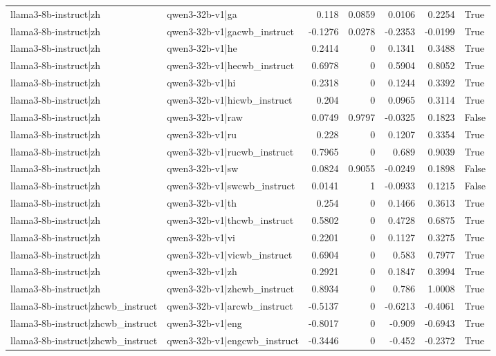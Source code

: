 \begin{table}
\begin{tabular}{l l r r r r l}
llama3-8b-instruct|zh & qwen3-32b-v1|ga & 0.118 & 0.0859 & 0.0106 & 0.2254 & True \\
llama3-8b-instruct|zh & qwen3-32b-v1|gacwb_instruct & -0.1276 & 0.0278 & -0.2353 & -0.0199 & True \\
llama3-8b-instruct|zh & qwen3-32b-v1|he & 0.2414 & 0 & 0.1341 & 0.3488 & True \\
llama3-8b-instruct|zh & qwen3-32b-v1|hecwb_instruct & 0.6978 & 0 & 0.5904 & 0.8052 & True \\
llama3-8b-instruct|zh & qwen3-32b-v1|hi & 0.2318 & 0 & 0.1244 & 0.3392 & True \\
llama3-8b-instruct|zh & qwen3-32b-v1|hicwb_instruct & 0.204 & 0 & 0.0965 & 0.3114 & True \\
llama3-8b-instruct|zh & qwen3-32b-v1|raw & 0.0749 & 0.9797 & -0.0325 & 0.1823 & False \\
llama3-8b-instruct|zh & qwen3-32b-v1|ru & 0.228 & 0 & 0.1207 & 0.3354 & True \\
llama3-8b-instruct|zh & qwen3-32b-v1|rucwb_instruct & 0.7965 & 0 & 0.689 & 0.9039 & True \\
llama3-8b-instruct|zh & qwen3-32b-v1|sw & 0.0824 & 0.9055 & -0.0249 & 0.1898 & False \\
llama3-8b-instruct|zh & qwen3-32b-v1|swcwb_instruct & 0.0141 & 1 & -0.0933 & 0.1215 & False \\
llama3-8b-instruct|zh & qwen3-32b-v1|th & 0.254 & 0 & 0.1466 & 0.3613 & True \\
llama3-8b-instruct|zh & qwen3-32b-v1|thcwb_instruct & 0.5802 & 0 & 0.4728 & 0.6875 & True \\
llama3-8b-instruct|zh & qwen3-32b-v1|vi & 0.2201 & 0 & 0.1127 & 0.3275 & True \\
llama3-8b-instruct|zh & qwen3-32b-v1|vicwb_instruct & 0.6904 & 0 & 0.583 & 0.7977 & True \\
llama3-8b-instruct|zh & qwen3-32b-v1|zh & 0.2921 & 0 & 0.1847 & 0.3994 & True \\
llama3-8b-instruct|zh & qwen3-32b-v1|zhcwb_instruct & 0.8934 & 0 & 0.786 & 1.0008 & True \\
llama3-8b-instruct|zhcwb_instruct & qwen3-32b-v1|arcwb_instruct & -0.5137 & 0 & -0.6213 & -0.4061 & True \\
llama3-8b-instruct|zhcwb_instruct & qwen3-32b-v1|eng & -0.8017 & 0 & -0.909 & -0.6943 & True \\
llama3-8b-instruct|zhcwb_instruct & qwen3-32b-v1|engcwb_instruct & -0.3446 & 0 & -0.452 & -0.2372 & True \\

\end{tabular}
\end{table}
